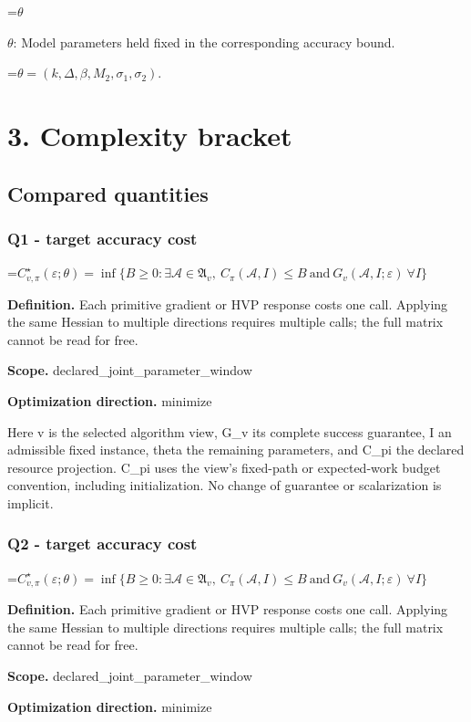 \documentclass[10pt,a4paper]{article}
\newcommand{\AtlasMath}[1]{\par\begingroup\centering\setbox0=\hbox{$\displaystyle #1$}\ifdim\wd0>1.4\linewidth\typeout{ATLAS WIDE FORMULA: \the\wd0}\fi\ifdim\wd0>\linewidth\resizebox{\linewidth}{!}{\box0}\else\box0\fi\par\endgroup}
\newcommand{\AtlasInlineMath}[1]{\begingroup\setbox0=\hbox{$#1$}\ifdim\wd0>.4\linewidth\endgroup\AtlasMath{#1}\else\endgroup$#1$\fi}
\begin{document}
\AtlasInlineMath{\theta}: Model parameters held fixed in the corresponding accuracy bound.


\AtlasMath{\theta=(k,\Delta,\beta,M_2,\sigma_1,\sigma_2).}


\section{3. Complexity bracket}
\subsection{Compared quantities}
\subsubsection{Q1 - target accuracy cost}
\AtlasMath{C^\star_{v,\pi}(\varepsilon;\theta)=\inf\{B\ge0:\exists\mathcal A\in\mathfrak A_v,\ C_\pi(\mathcal A,I)\le B\ \text{and}\ G_v(\mathcal A,I;\varepsilon)\ \forall I\}}
\textbf{Definition.} Each primitive gradient or HVP response costs one call. Applying the same Hessian to multiple directions requires multiple calls; the full matrix cannot be read for free.

\textbf{Scope.} declared\_joint\_parameter\_window

\textbf{Optimization direction.} minimize

Here v is the selected algorithm view, G\_v its complete success guarantee, I an admissible fixed instance, theta the remaining parameters, and C\_pi the declared resource projection. C\_pi uses the view's fixed-path or expected-work budget convention, including initialization. No change of guarantee or scalarization is implicit.

\subsubsection{Q2 - target accuracy cost}
\AtlasMath{C^\star_{v,\pi}(\varepsilon;\theta)=\inf\{B\ge0:\exists\mathcal A\in\mathfrak A_v,\ C_\pi(\mathcal A,I)\le B\ \text{and}\ G_v(\mathcal A,I;\varepsilon)\ \forall I\}}
\textbf{Definition.} Each primitive gradient or HVP response costs one call. Applying the same Hessian to multiple directions requires multiple calls; the full matrix cannot be read for free.

\textbf{Scope.} declared\_joint\_parameter\_window

\textbf{Optimization direction.} minimize
\end{document}
